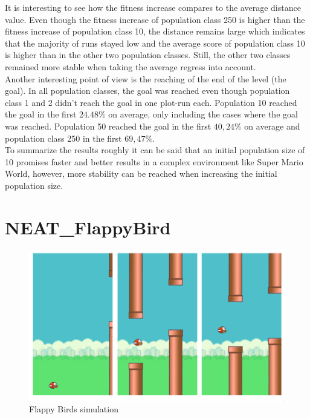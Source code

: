 			It is interesting to see how the fitness increase compares to the average distance value. Even though the fitness increase of population class 250 is higher than the fitness increase of population class 10, the distance remains large which indicates that the majority of runs stayed low and the average score of population class 10 is higher than in the other two population classes. Still, the other two classes remained more stable when taking the average regress into account. \\
			Another interesting point of view is the reaching of the end of the level (the goal). In all population classes, the goal was reached even though population class 1 and 2 didn't reach the goal in one plot-run each. Population 10 reached the goal in the first $24.48\%$ on average, only including the cases where the goal was reached. Population 50 reached the goal in the first $40,24\%$ on average and population class 250 in the first $69,47\%$.\\
			To summarize the results roughly it can be said that an initial population size of 10 promises faster and better results in a complex environment like Super Mario World, however, more stability can be reached when increasing the initial population size.
		
	
	\section{NEAT\_FlappyBird}
		\label{sec:analysis:flappy}
		
		\begin{figure}[h]
			\centering
			\includegraphics[width=1\textwidth]{graphics/flappy/flappy}
			\caption{Flappy Birds simulation}
			\label{fig:flappy}
		\end{figure}
	
